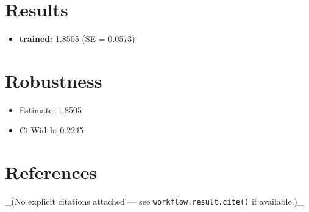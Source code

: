 \documentclass{article}
\begin{document}
\section{Results}
\begin{itemize}
  \item \textbf{trained}: 1.8505 (SE = 0.0573)
\end{itemize}

\section{Robustness}
\begin{itemize}
  \item Estimate: 1.8505
  \item Ci Width: 0.2245
\end{itemize}

\section{References}
_(No explicit citations attached — see \texttt{workflow.result.cite()} if available.)_
\end{document}
